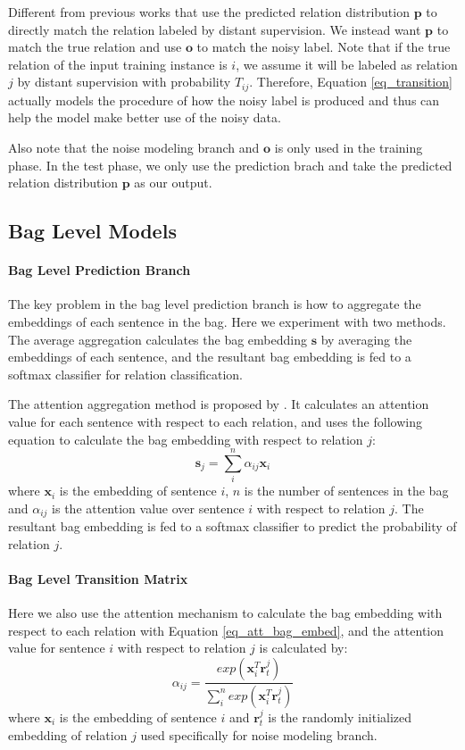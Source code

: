 Different from previous works that use the predicted relation distribution $\mathbf{p}$ to directly match the relation labeled by distant supervision. We instead want $\mathbf{p}$ to match the true relation and use $\mathbf{o}$ to match the noisy label. Note that if the true relation of the input training instance is $i$, we assume it will be labeled as relation $j$ by distant supervision with probability $T_{ij}$. Therefore, Equation \ref{eq_transition} actually models the procedure of how the noisy label is produced and thus can help the model make better use of the noisy data.

Also note that the noise modeling branch and $\mathbf{o}$ is only used in the training phase. In the test phase, we only use the prediction brach and take the predicted relation distribution $\mathbf{p}$ as our output. 

\subsection{Bag Level Models}
\paragraph{Bag Level Prediction Branch}
The key problem in the bag level prediction branch is how to aggregate the embeddings of each sentence in the bag. Here we experiment with two methods. The average aggregation calculates the bag embedding $\mathbf{s}$ by averaging the embeddings of each sentence, and the resultant bag embedding is fed to a softmax classifier for relation classification. 

The attention aggregation method is proposed by \cite{lin2016neural}. It calculates an attention value for each sentence with respect to each relation, and uses the following equation to calculate the bag embedding with respect to relation $j$:
\begin{equation}
\mathbf{s}_j = \sum_i^{n}{\alpha_{ij} \mathbf{x}_{i}}
\label{eq_att_bag_embed}
\end{equation}
where $\mathbf{x}_{i}$ is the embedding of sentence $i$, $n$ is the number of sentences in the bag and $\alpha_{ij}$ is the attention value over sentence $i$ with respect to relation $j$. The resultant bag embedding is fed to a softmax classifier to predict the probability of relation $j$.

\paragraph{Bag Level Transition Matrix}
Here we also use the attention mechanism to calculate the bag embedding with respect to each relation with Equation \ref{eq_att_bag_embed}, and the attention value for sentence $i$ with respect to relation $j$ is calculated by:
\begin{equation}
\alpha_{ij} = \frac{exp(\mathbf{x}_i^T \mathbf{r}_t^j)}{\sum_i^n{exp(\mathbf{x}_i^T \mathbf{r}_t^j)}}
\end{equation}
where $\mathbf{x}_i$ is the embedding of sentence $i$ and $\mathbf{r}_t^j$ is the randomly initialized embedding of relation $j$ used specifically for noise modeling branch. 

